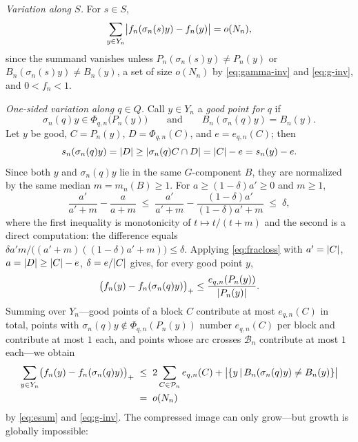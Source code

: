 \documentclass[11pt]{amsart}
\theoremstyle{definition}
\theoremstyle{plain}
\newcommand{\cP}{\mathcal P}
\newcommand{\cB}{\mathcal B}
\DeclarePairedDelimiter{\abs}{\lvert}{\rvert}
\newcommand{\set}[1]{\left\{#1\right\}}
\newcommand{\suchthat}{\,\middle|\,}
\begin{document}
\emph{Variation along \(S\).}  For \(s\in S\),
\begin{equation}\label{eq:svar}
 \sum_{y\in Y_n}\abs[\big]{f_n(\sigma_n(s)y)-f_n(y)}=o(N_n),
\end{equation}
since the summand vanishes unless \(P_n(\sigma_n(s)y)\ne P_n(y)\) or \(B_n(\sigma_n(s)y)\ne B_n(y)\), a set of size \(o(N_n)\) by \eqref{eq:gamma-inv} and \eqref{eq:g-inv}, and \(0<f_n<1\).

\emph{One-sided variation along \(q\in Q\).}  Call \(y\in Y_n\) a \emph{good point for \(q\)} if
\begin{equation}\label{eq:qgood}
 \sigma_n(q)y\in\Phi_{q,n}\bigl(P_n(y)\bigr)
 \qquad\text{and}\qquad
 B_n(\sigma_n(q)y)=B_n(y).
\end{equation}
Let \(y\) be good, \(C=P_n(y)\), \(D=\Phi_{q,n}(C)\), and \(e=e_{q,n}(C)\); then
\[
 s_n(\sigma_n(q)y)=\abs D\geq\abs{\sigma_n(q)C\cap D}=\abs C-e=s_n(y)-e.
\]
Since both \(y\) and \(\sigma_n(q)y\) lie in the same \(G\)-component \(B\), they are normalized by the same median \(m=m_n(B)\geq1\).  For \(a\geq(1-\delta)a'\geq0\) and \(m\geq1\),
\begin{equation}\label{eq:fracloss}
 \frac{a'}{a'+m}-\frac{a}{a+m}
 \;\leq\;
 \frac{a'}{a'+m}-\frac{(1-\delta)a'}{(1-\delta)a'+m}
 \;\leq\;\delta,
\end{equation}
where the first inequality is monotonicity of \(t\mapsto t/(t+m)\) and the second is a direct computation: the difference equals \(\delta a'm/\bigl((a'+m)((1-\delta)a'+m)\bigr)\leq\delta\).  Applying \eqref{eq:fracloss} with \(a'=\abs C\), \(a=\abs D\geq\abs C-e\), \(\delta=e/\abs C\) gives, for every good point \(y\),
\[
 \bigl(f_n(y)-f_n(\sigma_n(q)y)\bigr)_+\leq\frac{e_{q,n}(P_n(y))}{\abs{P_n(y)}}.
\]
Summing over \(Y_n\)---good points of a block \(C\) contribute at most \(e_{q,n}(C)\) in total, points with \(\sigma_n(q)y\notin\Phi_{q,n}(P_n(y))\) number \(e_{q,n}(C)\) per block and contribute at most \(1\) each, and points whose arc crosses \(\cB_n\) contribute at most \(1\) each---we obtain
\begin{equation}\label{eq:onesided}
\begin{split}
 \sum_{y\in Y_n}\bigl(f_n(y)-f_n(\sigma_n(q)y)\bigr)_+
 &\;\leq\;
 2\sum_{C\in\cP_n}e_{q,n}(C)
 +\abs[\big]{\set{y\suchthat B_n(\sigma_n(q)y)\ne B_n(y)}}\\
 &\;=\;o(N_n)
\end{split}
\end{equation}
by \eqref{eq:esum} and \eqref{eq:g-inv}.  The compressed image can only grow---but growth is globally impossible:
\end{document}
